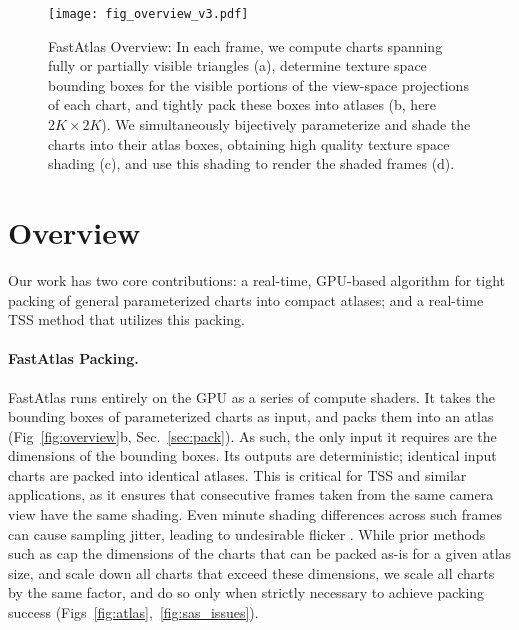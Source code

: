 \begin{figure*}[t]
\begin{center}
\texttt{[image: fig\_overview\_v3.pdf]}
\end{center}
\caption{
FastAtlas Overview: In each frame, we compute charts spanning fully or partially visible triangles (a), determine texture space bounding boxes for the visible portions of the view-space projections of each chart, and tightly pack these boxes into atlases (b, here $2K \times 2K$). We simultaneously bijectively parameterize and shade the charts into their atlas boxes, obtaining high quality texture space shading (c), and use this shading to render the shaded frames (d).}
\label{fig:overview}
\label{fig:alg_overview}
\end{figure*}

\section{Overview}
\label{sec:overview}
Our work has two core contributions: a real-time, GPU-based algorithm for tight packing of general parameterized charts into compact atlases; and a real-time TSS method that
utilizes this packing.  

\paragraph*{FastAtlas Packing.}
FastAtlas runs entirely on the GPU as a series of compute shaders. It takes the bounding boxes of parameterized charts as input, and packs them into an atlas (Fig~\ref{fig:overview}b, Sec.~\ref{sec:pack}). As such, the only input it requires are the dimensions of the bounding boxes.
Its outputs are deterministic; identical input charts are packed into identical atlases. This is critical for TSS and similar applications, as it ensures that consecutive frames taken from the same camera view have the same shading. Even minute shading differences across such frames can cause sampling jitter, leading to undesirable flicker \cite{baker2012rock}. 
While prior methods such as \cite{mueller2018shading,hladky2019tessellated,hladky2021snakebinning,Neff2022MSA} cap the dimensions of the charts that can be packed as-is for a given atlas size, and scale down all charts that exceed these dimensions, we scale all charts by the same factor, and do so only when strictly necessary to achieve packing success (Figs~\ref{fig:atlas},~\ref{fig:sas_issues}). 

